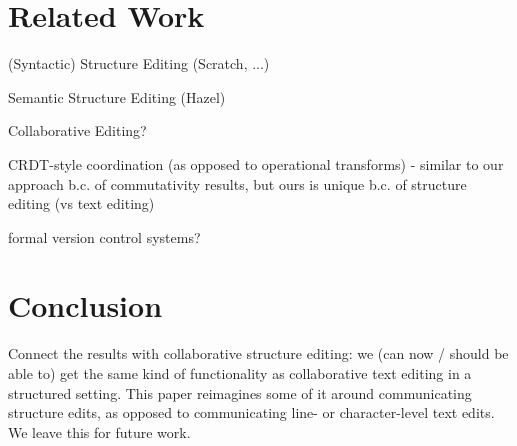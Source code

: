 \documentclass[nonacm, acmsmall, screen, review]{acmart}
\begin{document}




\section{Related Work}
\label{sec:related-work}

% 

(Syntactic) Structure Editing (Scratch, ...)


Semantic Structure Editing (Hazel)

Collaborative Editing?

CRDT-style coordination (as opposed to operational transforms)
- similar to our approach b.c. of commutativity results, but ours is unique b.c. of structure editing (vs text editing)

formal version control systems?


\section{Conclusion}
\label{sec:conclusion}

Connect the results with collaborative structure editing: we (can now / should be able to) get the same kind of functionality as collaborative text editing in a structured setting. 
This paper reimagines some of it around communicating structure edits, as opposed to communicating line- or character-level text edits.
We leave this for future work.
\end{document}

